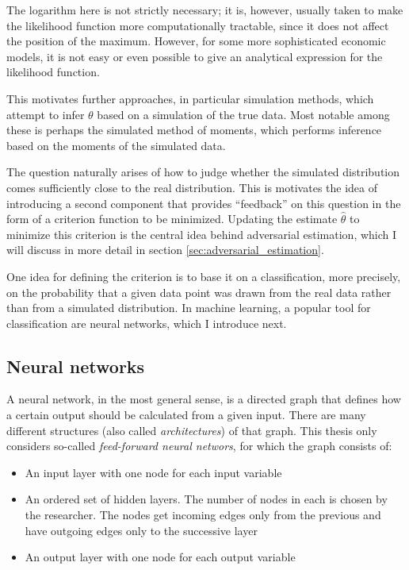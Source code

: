 The logarithm here is not strictly necessary; it is, however, usually taken to make the likelihood function more computationally tractable, since it does not affect the position of the maximum.
However, for some more sophisticated economic models, it is not easy or even possible to give an analytical expression for the likelihood function.

This motivates further approaches, in particular simulation methods, which attempt to infer $\theta$ based on a simulation of the true data.
Most notable among these is perhaps the simulated method of moments, which performs inference based on the moments of the simulated data. %

The question naturally arises of how to judge whether the simulated distribution comes sufficiently close to the real distribution.
This is motivates the idea of introducing a second component that provides ``feedback'' on this question in the form of a criterion function to be minimized.
Updating the estimate $\hat{\theta}$ to minimize this criterion is the central idea behind adversarial estimation, which I will discuss in more detail in section \ref{sec:adversarial_estimation}.

One idea for defining the criterion is to base it on a classification, more precisely, on the probability that a given data point was drawn from the real data rather than from a simulated distribution.
In machine learning, a popular tool for classification are neural networks, which I introduce next.

\subsection{Neural networks}
\label{sec:neural_networks}

A neural network, in the most general sense, is a directed graph that defines how a certain output should be calculated from a given input.
There are many different structures (also called \textit{architectures}) of that graph.
This thesis only considers so-called \textit{feed-forward neural networs}, for which the graph consists of:

\begin{itemize}
    \item An input layer with one node for each input variable
    \item An ordered set of hidden layers. The number of nodes in each is chosen by the researcher. The nodes get incoming edges only from the previous and have outgoing edges only to the successive layer
    \item An output layer with one node for each output variable
\end{itemize}

